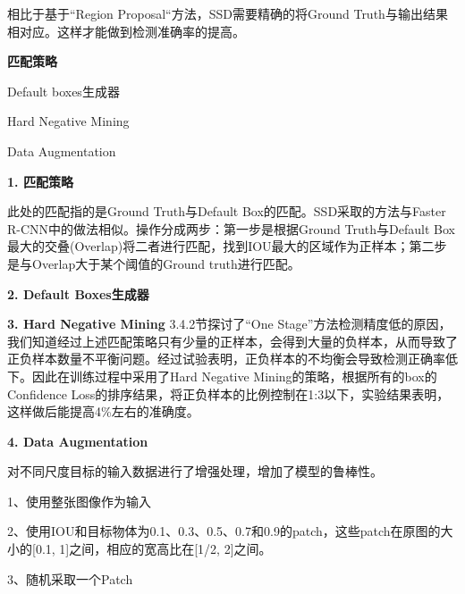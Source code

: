 相比于基于“Region Proposal“方法，SSD需要精确的将Ground Truth与输出结果相对应。这样才能做到检测准确率的提高。

\textbf{匹配策略}

\line

Default boxes生成器

Hard Negative Mining

Data Augmentation

\line

\textbf{1. 匹配策略}

此处的匹配指的是Ground Truth与Default Box的匹配。SSD采取的方法与Faster R-CNN中的做法相似。操作分成两步：第一步是根据Ground Truth与Default Box最大的交叠(Overlap)将二者进行匹配，找到IOU最大的区域作为正样本；第二步是与Overlap大于某个阈值的Ground truth进行匹配。

\textbf{2. Default Boxes生成器}

\textbf{3. Hard Negative Mining}
3.4.2节探讨了“One Stage”方法检测精度低的原因，我们知道经过上述匹配策略只有少量的正样本，会得到大量的负样本，从而导致了正负样本数量不平衡问题。经过试验表明，正负样本的不均衡会导致检测正确率低下\cite{focal-loss}。因此在训练过程中采用了Hard Negative Mining\cite{hnm}的策略，根据所有的box的Confidence Loss的排序结果，将正负样本的比例控制在1:3以下，实验结果表明，这样做后能提高4\%左右的准确度。

\textbf{4. Data Augmentation}

对不同尺度目标的输入数据进行了增强处理，增加了模型的鲁棒性。

1、使用整张图像作为输入

2、使用IOU和目标物体为0.1、0.3、0.5、0.7和0.9的patch，这些patch在原图的大小的[0.1, 1]之间，相应的宽高比在[1/2, 2]之间。

3、随机采取一个Patch

